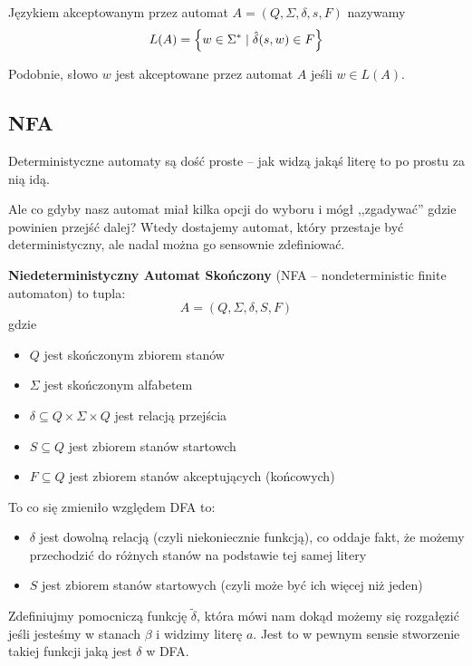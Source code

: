 \begin{definition}
    Językiem akceptowanym przez automat \( A = (Q, \Sigma, \delta, s, F) \) nazywamy
    \[
        L(A) = \set{w \in \Sigma^* \mid \hat \delta(s, w) \in F}
    \]
    
    Podobnie, słowo \( w \) jest akceptowane przez automat \( A \) jeśli \( w \in L(A) \). 
\end{definition}

\subsection{NFA}

Deterministyczne automaty są dość proste -- jak widzą jakąś literę to po prostu za nią idą.

Ale co gdyby nasz automat miał kilka opcji do wyboru i mógł ,,zgadywać'' gdzie powinien przejść dalej? Wtedy dostajemy automat, który przestaje być deterministyczny, ale nadal można go sensownie zdefiniować.

\begin{definition}
    \textbf{Niedeterministyczny Automat Skończony} (NFA -- nondeterministic finite automaton) to tupla:
    \[
        A = (Q, \Sigma, \delta, S, F)
    \]
    gdzie
    \begin{itemize}
        \item \( Q \) jest skończonym zbiorem stanów
        \item \( \Sigma \) jest skończonym alfabetem
        \item \( \delta \subseteq Q \times \Sigma \times Q \) jest relacją przejścia
        \item \( S \subseteq Q \) jest zbiorem stanów startowch
        \item \( F \subseteq Q \) jest zbiorem stanów akceptujących (końcowych)
    \end{itemize}
\end{definition}

To co się zmieniło względem DFA to:
\begin{itemize}
    \item \( \delta \) jest dowolną relacją (czyli niekoniecznie funkcją), co oddaje fakt, że możemy przechodzić do różnych stanów na podstawie tej samej litery
    \item \( S \) jest zbiorem stanów startowych (czyli może być ich więcej niż jeden)
\end{itemize}

Zdefiniujmy pomocniczą funkcję \( \tilde \delta \), która mówi nam dokąd możemy się rozgałęzić jeśli jesteśmy w stanach \( \beta \) i widzimy literę \( a \). Jest to w pewnym sensie stworzenie takiej funkcji jaką jest \( \delta \) w DFA.

